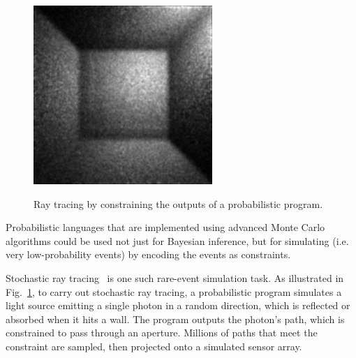\documentclass{llncs}
\newcommand{\figref}[1]{Fig.~\ref{#1}}
\begin{document}
\begin{figure}[!tb]
{\begin{minipage}{0.43\textwidth}
\includegraphics[width=\textwidth]{ray-tracing-projection.png}
\end{minipage}
\label{fig:ray-tracing-projection}
}

\caption[ ]{Ray tracing by constraining the outputs of a probabilistic program.}
\label{fig:ray-tracing}
\end{figure}

Probabilistic languages that are implemented using advanced Monte Carlo algorithms could be used not just for Bayesian inference, but for simulating  (i.e. very low-probability events) by encoding the events as constraints.

Stochastic ray tracing~\cite{cit:veach-1997siggraph-mlt} is one such rare-event simulation task.
As illustrated in \figref{fig:ray-tracing}, to carry out stochastic ray tracing, a probabilistic program simulates a light source emitting a single photon in a random direction, which is reflected or absorbed when it hits a wall.
The program outputs the photon's path, which is constrained to pass through an aperture.
Millions of paths that meet the constraint are sampled, then projected onto a simulated sensor array.
\end{document}
